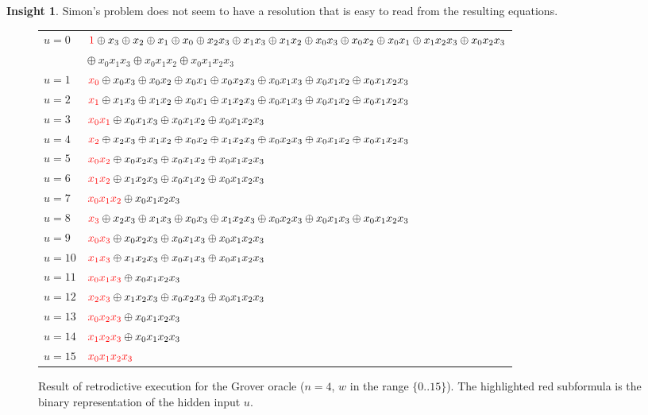 \documentclass[sigplan,screen]{acmart}
\newcommand{\red}[1]{{\color{red}{#1}}}
\theoremstyle{definition}
\newtheorem*{insight}{Insight}
\begin{document}
\begin{insight}
  Simon's problem does not seem to have a resolution that is easy to read
  from the resulting equations.
\end{insight}

\begin{figure}
\begin{tabular}{ll}
$u=0$ &
  $\red{1} \oplus x_3 \oplus x_2 \oplus x_1 \oplus x_0 \oplus x_2x_3 \oplus x_1x_3 \oplus x_1x_2 \oplus x_0x_3 \oplus x_0x_2 \oplus x_0x_1 \oplus x_1x_2x_3 \oplus x_0x_2x_3$ \\
   &\quad $\oplus ~x_0x_1x_3 \oplus x_0x_1x_2 \oplus x_0x_1x_2x_3$ \\
$u=1$ &
  $\red{x_0} \oplus x_0x_3 \oplus x_0x_2 \oplus x_0x_1 \oplus x_0x_2x_3 \oplus x_0x_1x_3 \oplus x_0x_1x_2 \oplus x_0x_1x_2x_3$ \\
$u=2$ &
  $\red{x_1} \oplus x_1x_3 \oplus x_1x_2 \oplus x_0x_1 \oplus x_1x_2x_3 \oplus x_0x_1x_3 \oplus x_0x_1x_2 \oplus x_0x_1x_2x_3$ \\
$u=3$ &
  $\red{x_0x_1} \oplus x_0x_1x_3 \oplus x_0x_1x_2 \oplus x_0x_1x_2x_3$ \\
$u=4$ &
  $\red{x_2} \oplus x_2x_3 \oplus x_1x_2 \oplus x_0x_2 \oplus x_1x_2x_3 \oplus x_0x_2x_3 \oplus x_0x_1x_2 \oplus x_0x_1x_2x_3$ \\
$u=5$ &
  $\red{x_0x_2} \oplus x_0x_2x_3 \oplus x_0x_1x_2 \oplus x_0x_1x_2x_3$ \\
$u=6$ &
  $\red{x_1x_2} \oplus x_1x_2x_3 \oplus x_0x_1x_2 \oplus x_0x_1x_2x_3$ \\
$u=7$ &
  $\red{x_0x_1x_2} \oplus x_0x_1x_2x_3$ \\
$u=8$ &
  $\red{x_3} \oplus x_2x_3 \oplus x_1x_3 \oplus x_0x_3 \oplus x_1x_2x_3 \oplus x_0x_2x_3 \oplus x_0x_1x_3 \oplus x_0x_1x_2x_3$ \\
$u=9$ &
  $\red{x_0x_3} \oplus x_0x_2x_3 \oplus x_0x_1x_3 \oplus x_0x_1x_2x_3$ \\
$u=10$ &
  $\red{x_1x_3} \oplus x_1x_2x_3 \oplus x_0x_1x_3 \oplus x_0x_1x_2x_3$ \\
$u=11$ &
  $\red{x_0x_1x_3} \oplus x_0x_1x_2x_3$ \\
$u=12$ &
  $\red{x_2x_3} \oplus x_1x_2x_3 \oplus x_0x_2x_3 \oplus x_0x_1x_2x_3$ \\
$u=13$ &
  $\red{x_0x_2x_3} \oplus x_0x_1x_2x_3$ \\
$u=14$ &
  $\red{x_1x_2x_3} \oplus x_0x_1x_2x_3$ \\
$u=15$ &
  $\red{x_0x_1x_2x_3}$
\end{tabular}
\caption{\label{fig:Grover}Result of retrodictive execution for the Grover oracle ($n=4$, $w$ in the range $\{0..15\}$). The highlighted red subformula is the binary representation of the hidden input $u$.}
\end{figure}
\end{document}
